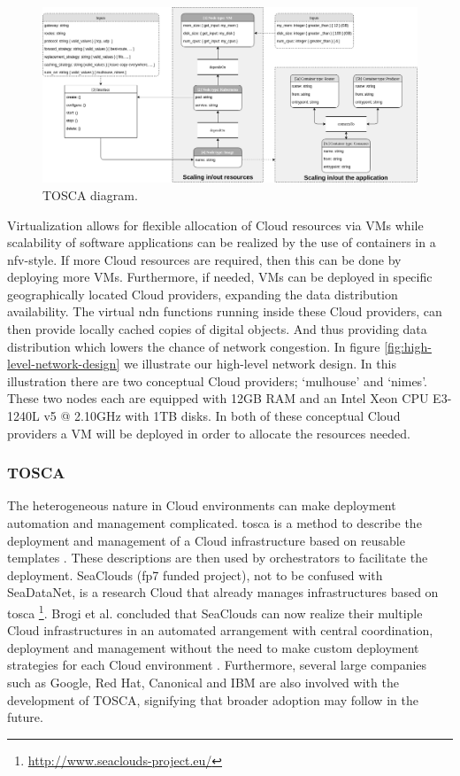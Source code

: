 \documentclass[conference]{IEEEtran}
\begin{document}
\begin{figure}[ht]
\centering
\includegraphics[width=\textwidth]{images/tosca-diagram.png}
\caption{TOSCA diagram.}
\label{fig:tosca-diagram}
\end{figure}

Virtualization allows for flexible allocation of Cloud resources via VMs while scalability of software applications can be realized by the use of containers in a \gls{nfv}-style. If more Cloud resources are required, then this can be done by deploying more VMs. Furthermore, if needed, VMs can be deployed in specific geographically located Cloud providers, expanding the data distribution availability. The virtual \gls{ndn} functions running inside these Cloud providers, can then provide locally cached copies of digital objects. And thus providing data distribution which lowers the chance of network congestion. In figure \ref{fig:high-level-network-design} we illustrate our high-level network design. In this illustration there are two conceptual Cloud providers; `mulhouse' and `nimes'. These two nodes each are equipped with 12GB RAM and an Intel Xeon CPU E3-1240L v5 @ 2.10GHz with 1TB disks. In both of these conceptual Cloud providers a VM will be deployed in order to allocate the resources needed.


\subsubsection{TOSCA}
The heterogeneous nature in Cloud environments can make deployment automation and management complicated. \gls{tosca} is a method to describe the deployment and management of a Cloud infrastructure based on reusable templates \cite{tosca-standard}. These descriptions are then used by orchestrators to facilitate the deployment. SeaClouds (\gls{fp7} funded project), not to be confused with SeaDataNet, is a research Cloud that already manages infrastructures based on \gls{tosca} \footnote{\url{http://www.seaclouds-project.eu/}}. Brogi et al. concluded that SeaClouds can now realize their multiple Cloud infrastructures in an automated arrangement with central coordination, deployment and management without the need to make custom deployment strategies for each Cloud environment \cite{brogi2015adaptive}. Furthermore, several large companies such as Google, Red Hat, Canonical and IBM are also involved with the development of TOSCA, signifying that broader adoption may follow in the future.
\end{document}
